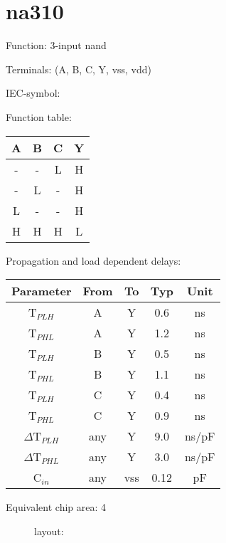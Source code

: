 \section{na310}

Function: 3-input nand

Terminals: (A, B, C, Y, vss, vdd)


IEC-symbol:
\begin{figure}[bth]
\end{figure}

Function table:
\begin{table}[bth]
\begin{tabular}{|c|c|c||c|}
\hline
A	&B	&C	&Y\\
\hline
-	&-	&L	&H\\
-	&L	&-	&H\\
L	&-	&-	&H\\
H	&H	&H	&L\\
\hline
\end{tabular}

\vspace{1cm}

Propagation and load dependent delays:\\

\begin{tabular}{|c|c|c|c|c|}
\hline
Parameter               &From            &To   &Typ    &Unit\\
\hline
T$_{PLH}$               &A     		&Y      &0.6    &ns\\
T$_{PHL}$               &A    		&Y      &1.2    &ns\\
T$_{PLH}$               &B     		&Y      &0.5    &ns\\
T$_{PHL}$               &B    		&Y      &1.1    &ns\\
T$_{PLH}$               &C     		&Y      &0.4    &ns\\
T$_{PHL}$               &C    		&Y      &0.9    &ns\\
\hline
$\Delta$T$_{PLH}$       &any          	&Y      &9.0    &ns/pF\\
$\Delta$T$_{PHL}$       &any           	&Y      &3.0    &ns/pF\\
\hline
C$_{in}$                &any	    	&vss    &0.12   &pF\\
\hline
\end{tabular}
\end{table}


Equivalent chip area: 4





\begin{figure}[bth]
layout:\\

\end{figure}


\clearpage
